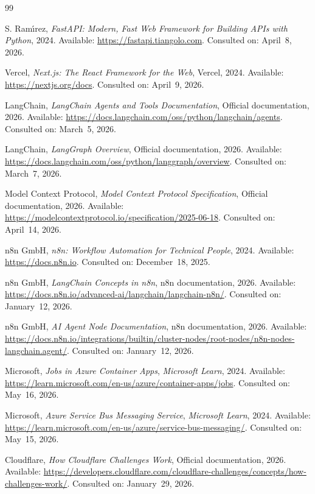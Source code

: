 \documentclass[12pt,a4paper,twoside]{report}
\begin{document}
\begin{thebibliography}{99}

S. Ram\'{\i}rez,
\emph{FastAPI\@: Modern, Fast Web Framework for Building APIs with Python},
2024. Available: \url{https://fastapi.tiangolo.com}. Consulted on: April~8, 2026.

Vercel,
\emph{Next.js: The React Framework for the Web},
Vercel, 2024.
Available: \url{https://nextjs.org/docs}. Consulted on: April~9, 2026.

LangChain,
\emph{LangChain Agents and Tools Documentation},
Official documentation, 2026.
Available: \url{https://docs.langchain.com/oss/python/langchain/agents}. Consulted on: March~5, 2026.

LangChain,
\emph{LangGraph Overview},
Official documentation, 2026.
Available: \url{https://docs.langchain.com/oss/python/langgraph/overview}. Consulted on: March~7, 2026.

Model Context Protocol,
\emph{Model Context Protocol Specification},
Official documentation, 2026.
Available: \url{https://modelcontextprotocol.io/specification/2025-06-18}. Consulted on: April~14, 2026.

n8n GmbH,
\emph{n8n: Workflow Automation for Technical People},
2024.
Available: \url{https://docs.n8n.io}. Consulted on: December~18, 2025.

n8n GmbH,
\emph{LangChain Concepts in n8n},
n8n documentation, 2026.
Available: \url{https://docs.n8n.io/advanced-ai/langchain/langchain-n8n/}. Consulted on: January~12, 2026.

n8n GmbH,
\emph{AI Agent Node Documentation},
n8n documentation, 2026.
Available: \url{https://docs.n8n.io/integrations/builtin/cluster-nodes/root-nodes/n8n-nodes-langchain.agent/}. Consulted on: January~12, 2026.


Microsoft,
\emph{Jobs in Azure Container Apps},
\emph{Microsoft Learn}, 2024.
Available: \url{https://learn.microsoft.com/en-us/azure/container-apps/jobs}. Consulted on: May~16, 2026.

Microsoft,
\emph{Azure Service Bus Messaging Service},
\emph{Microsoft Learn}, 2024.
Available: \url{https://learn.microsoft.com/en-us/azure/service-bus-messaging/}. Consulted on: May~15, 2026.

Cloudflare,
\emph{How Cloudflare Challenges Work},
Official documentation, 2026.
Available: \url{https://developers.cloudflare.com/cloudflare-challenges/concepts/how-challenges-work/}. Consulted on: January~29, 2026.


\end{thebibliography}
\end{document}
